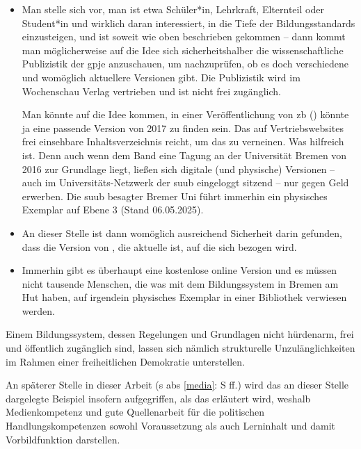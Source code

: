 \begin{itemize}
    \item Man stelle sich vor, man ist etwa Schüler*in, Lehrkraft, Elternteil oder Student*in und wirklich daran interessiert, in die Tiefe der Bildungsstandards einzusteigen, und ist soweit wie oben beschrieben gekommen -- dann kommt man möglicherweise auf die Idee sich sicherheitshalber die wissenschaftliche Publizistik der \gls{gpje} anzuschauen, um nachzuprüfen, ob es doch verschiedene und womöglich aktuellere Versionen gibt. Die Publizistik wird im Wochenschau Verlag vertrieben und ist nicht frei zugänglich. 
    
    Man könnte auf die Idee kommen, in einer Veröffentlichung von \citeyear{Gortler.2017} \gls{zb} (\citeauthor{Gortler.2017}) könnte ja eine passende Version von 2017 zu finden sein. Das auf Vertriebswebsites frei einsehbare Inhaltsverzeichnis reicht, um das zu verneinen. Was hilfreich ist. Denn auch wenn dem Band eine Tagung an der Universität Bremen von 2016 zur Grundlage liegt, ließen sich digitale (und physische) Versionen -- auch im Universitäts-Netzwerk der \gls{suub} eingeloggt sitzend -- nur gegen Geld erwerben. Die \gls{suub} besagter Bremer Uni führt immerhin ein physisches Exemplar auf Ebene 3 (Stand 06.05.2025). 

    \item An dieser Stelle ist dann womöglich ausreichend Sicherheit darin gefunden, dass die Version von \citeyear{gpje2004}, die aktuelle ist, auf die sich bezogen wird.

    \item Immerhin gibt es überhaupt eine kostenlose online Version und es müssen nicht tausende Menschen, die was mit dem Bildungssystem in Bremen am Hut haben, auf irgendein physisches Exemplar in einer Bibliothek verwiesen werden. %
\end{itemize}
Einem Bildungssystem, dessen Regelungen und Grundlagen nicht hürdenarm, frei und öffentlich zugänglich sind, lassen sich nämlich strukturelle Unzulänglichkeiten im Rahmen einer freiheitlichen Demokratie unterstellen. 

An späterer Stelle in dieser Arbeit (\gls{s} \gls{abs} \ref{media}: \gls{S} \pageref{media}ff.) wird das an dieser Stelle dargelegte Beispiel insofern aufgegriffen, als das erläutert wird, weshalb Medienkompetenz und gute Quellenarbeit für die politischen Handlungskompetenzen sowohl Voraussetzung als auch Lerninhalt und damit Vorbildfunktion darstellen. 


